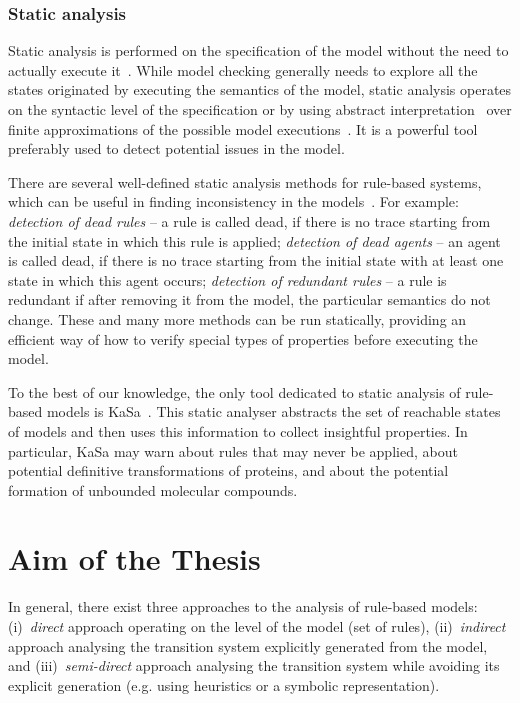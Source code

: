 \documentclass[11pt,a4paper]{report}
\begin{document}
\subsection{Static analysis}\label{static_analysis}

Static analysis is performed on the specification of the model without the need to actually execute it~\cite{nielson2015principles}. While model checking generally needs to explore all the states originated by executing the semantics of the model, static analysis operates on the syntactic level of the specification or by using abstract interpretation~\cite{cousot1977abstract} over finite approximations of the possible model executions~\cite{pauleve2012static}. It is a powerful tool preferably used to detect potential issues in the model.

There are several well-defined static analysis methods for rule-based systems, which can be useful in finding inconsistency in the models~\cite{danos2009rule}. For example: \emph{detection of dead rules} -- a rule is called dead, if there is no trace starting from the initial state in which this rule is applied; \emph{detection of dead agents} -- an agent is called dead, if there is no trace starting from the initial state with at least one state in which this agent occurs; \emph{detection of redundant rules} -- a rule is redundant if after removing it from the model, the particular semantics do not change. These and many more methods can be run statically, providing an efficient way of how to verify special types of properties before executing the model.

To the best of our knowledge, the only tool dedicated to static analysis of rule-based models is KaSa~\cite{boutillier2018kasa}. This static analyser abstracts the set of reachable states of models and then uses this information to collect insightful properties. In particular, KaSa may warn about rules that may never be applied, about potential definitive transformations of proteins, and about the potential formation of unbounded molecular compounds.

\chapter{Aim of the Thesis} \label{chap:aim}

In general, there exist three approaches to the analysis of rule-based models: (i)~\emph{direct} approach operating on the level of the model (set of rules), (ii)~\emph{indirect} approach analysing the transition system explicitly generated from the model, and (iii)~\emph{semi-direct} approach analysing the transition system while avoiding its explicit generation (e.g. using heuristics or a symbolic representation).
\end{document}
